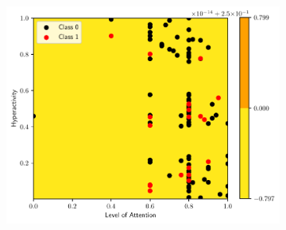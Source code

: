 \begin{figure}
\begin{subfigure}[b]{0.32\textwidth}
        \centering
        \includegraphics[width=\textwidth]{figs/tree-contour-0-5.pdf}
        \caption{}
    \end{subfigure}


\end{figure}
